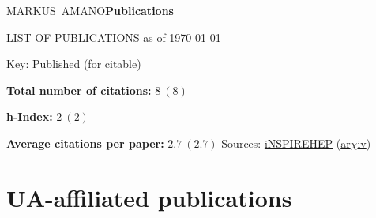 \documentclass[11pt,letter]{article}
\begin{document}
\begin{cv}{\large MARKUS~AMANO\hfill {\bf \small Publications}}

\noindent\hrulefill

\begin{center}
\huge LIST OF PUBLICATIONS as of \today
\end{center}

\begin{cvlist}{}
\item[Key: Published (for citable)]
\item[\bf Total number of citations:] $8~(8)$
\item[\bf h-Index:] $2~(2)$
\item[\bf Average citations per paper:] $2.7~(2.7)$    \hfill Sources: \href{https://inspirehep.net/literature?sort=mostrecent&size=25&page=1&q=a\%20M.Garbiso.1&ui-citation-summary=true}{iNSPIREHEP} 
(\href{https://arxiv.org/search/?searchtype=author&query=Garbiso\%2C+M}{ar$\chi$iv})

\hrulefill
%

\section*{UA-affiliated publications}

%

\hrulefill


\end{cvlist}
\end{cv}
\end{document}
